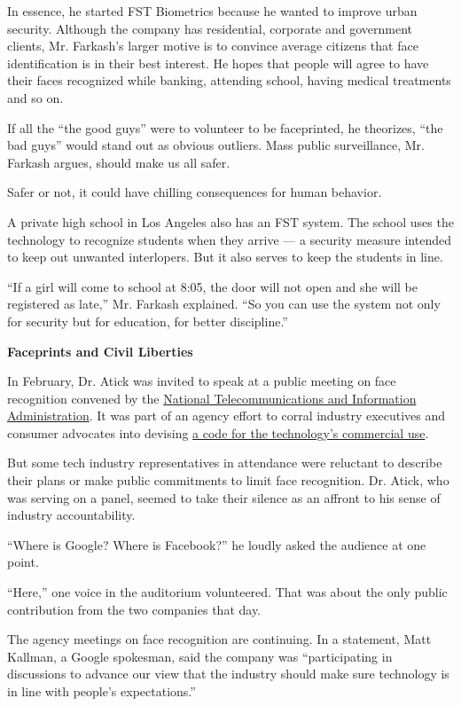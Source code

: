 In essence, he started FST Biometrics because he wanted to improve urban
security. Although the company has residential, corporate and government
clients, Mr. Farkash's larger motive is to convince average citizens
that face identification is in their best interest. He hopes that people
will agree to have their faces recognized while banking, attending
school, having medical treatments and so on.

If all the ``the good guys'' were to volunteer to be faceprinted, he
theorizes, ``the bad guys'' would stand out as obvious outliers. Mass
public surveillance, Mr. Farkash argues, should make us all safer.

Safer or not, it could have chilling consequences for human behavior.

A private high school in Los Angeles also has an FST system. The school
uses the technology to recognize students when they arrive --- a
security measure intended to keep out unwanted interlopers. But it also
serves to keep the students in line.

``If a girl will come to school at 8:05, the door will not open and she
will be registered as late,'' Mr. Farkash explained. ``So you can use
the system not only for security but for education, for better
discipline.''

\textbf{Faceprints and Civil Liberties}

In February, Dr. Atick was invited to speak at a public meeting on face
recognition convened by the \href{http://www.ntia.doc.gov/}{National
Telecommunications and Information Administration}. It was part of an
agency effort to corral industry executives and consumer advocates into
devising
\href{http://www.nytimes3xbfgragh.onion/2014/02/02/technology/when-no-one-is-just-a-face-in-the-crowd.html}{a
code for the technology's commercial use}.

But some tech industry representatives in attendance were reluctant to
describe their plans or make public commitments to limit face
recognition. Dr. Atick, who was serving on a panel, seemed to take their
silence as an affront to his sense of industry accountability.

``Where is Google? Where is Facebook?'' he loudly asked the audience at
one point.

``Here,'' one voice in the auditorium volunteered. That was about the
only public contribution from the two companies that day.

The agency meetings on face recognition are continuing. In a statement,
Matt Kallman, a Google spokesman, said the company was ``participating
in discussions to advance our view that the industry should make sure
technology is in line with people's expectations.''

